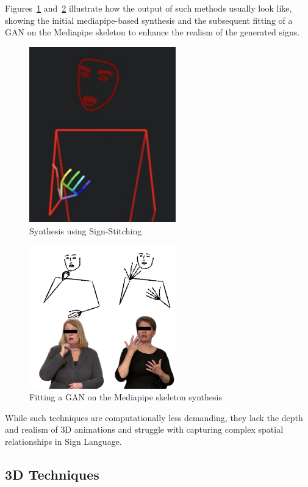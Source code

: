 \documentclass[../../main.tex]{subfiles}
\begin{document}
Figures~\ref{fig:synthesis_mediaipe_2d} and~\ref{fig:synthesis_gan_2d} illustrate how the output of such methods usually look like, showing the initial mediapipe-based synthesis and the subsequent fitting of a GAN on the Mediapipe skeleton to enhance the realism of the generated signs.

\begin{figure} 
  \centering \includegraphics[width = 2.5in]{chapters/background_work/images/sign_writing_synthesis.png} 
  \caption{Synthesis using Sign-Stitching} 
  \label{fig:synthesis_mediaipe_2d} 
\end{figure}

\begin{figure} 
  \centering \includegraphics[width = 2.5in]{chapters/background_work/images/gan_synthesis.png} 
  \caption{Fitting a GAN on the Mediapipe skeleton synthesis} 
  \label{fig:synthesis_gan_2d} 
\end{figure}

While such techniques are computationally less demanding, they lack the depth and realism of 3D animations and struggle with capturing complex spatial relationships in Sign Language.

\subsection{3D Techniques}
\label{ch:background_work:sign_language_synthesis:3d_techniques}
\end{document}
